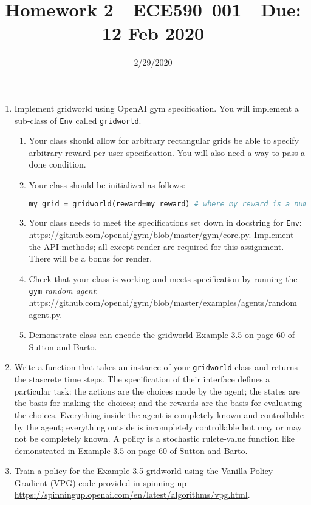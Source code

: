 \documentclass{article}
\title{Homework 2---ECE590--001---{\bf Due: 12 Feb 2020}}
\date{2/29/2020}
\begin{document}
\maketitle
\begin{enumerate}
\item Implement gridworld using OpenAI gym specification. You will implement a sub-class of {\tt Env} called {\tt gridworld}.
  \begin{enumerate}
  \item Your class should allow for arbitrary rectangular grids be able to specify arbitrary reward per user specification. You will also need a way to pass a done condition.
  \item Your class should be initialized as follows:
    \begin{lstlisting}[language=python]
      my_grid = gridworld(reward=my_reward) # where my_reward is a numpy.array of shape (n,m)
    \end{lstlisting}
  \item Your class needs to meet the specifications set down in docstring for {\tt Env}: \url{https://github.com/openai/gym/blob/master/gym/core.py}. Implement the API methods; all except
    render are required for this assignment. There will be a bonus for render.
  \item Check that your class is working and meets specification by running the {\tt gym} {\em random agent}: \url{https://github.com/openai/gym/blob/master/examples/agents/random_agent.py}.
  \item Demonstrate class can encode the gridworld Example 3.5 on page 60 of \href{http://incompleteideas.net/book/RLbook2018.pdf}{Sutton and Barto}.
  \end{enumerate}
\item Write a function that takes an instance of your {\tt gridworld} class and returns the stascrete time steps. The specification of their
interface defines a particular task: the actions are the choices made by the agent; the
states are the basis for making the choices; and the rewards are the basis for evaluating
the choices. Everything inside the agent is completely known and controllable by the
agent; everything outside is incompletely controllable but may or may not be completely
known. A policy is a stochastic rulete-value function like demonstrated in Example 3.5 on page 60 of
  \href{http://incompleteideas.net/book/RLbook2018.pdf}{Sutton and Barto}.
\item Train a policy for the Example 3.5 gridworld using the Vanilla Policy Gradient (VPG) code provided in spinning up \url{https://spinningup.openai.com/en/latest/algorithms/vpg.html}.

\end{enumerate}
\end{document}
